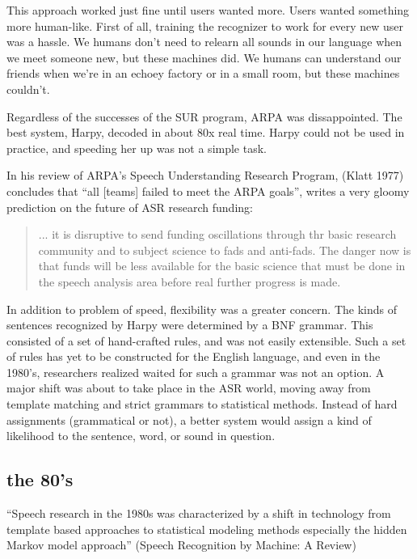 \documentclass[10pt,a4paper]{article}
\begin{document}
This approach worked just fine until users wanted more. Users wanted something more human-like. First of all, training the recognizer to work for every new user was a hassle. We humans don't need to relearn all sounds in our language when we meet someone new, but these machines did. We humans can understand our friends when we're in an echoey factory or in a small room, but these machines couldn't.

Regardless of the successes of the SUR program, ARPA was dissappointed. The best system, Harpy, decoded in about 80x real time. Harpy could not be used in practice, and speeding her up was not a simple task.


In his review of ARPA's Speech Understanding Research Program, (Klatt 1977) concludes that ``all [teams] failed to meet the ARPA goals'', writes a very gloomy prediction on the future of ASR research funding:

\begin{quote}
  ... it is disruptive to send funding oscillations through thr basic research community and to subject science to fads and anti-fads. The danger now is that funds will be less available for the basic science that must be done in the speech analysis area before real further progress is made.
\end{quote}

In addition to problem of speed, flexibility was a greater concern. The kinds of sentences recognized by Harpy were determined by a BNF grammar. This consisted of a set of hand-crafted rules, and was not easily extensible. Such a set of rules has yet to be constructed for the English language, and even in the 1980's, researchers realized waited for such a grammar was not an option. A major shift was about to take place in the ASR world, moving away from template matching and strict grammars to statistical methods. Instead of hard assignments (grammatical or not), a better system would assign a kind of likelihood to the sentence, word, or sound in question.

\subsection{the 80's}

``Speech  research  in 
the  1980s  was  characterized  by  a  shift  in  technology  from 
template  based  approaches  to  statistical  modeling  methods 
especially   the   hidden   Markov   model   approach'' (Speech Recognition by Machine: A Review)
\end{document}
